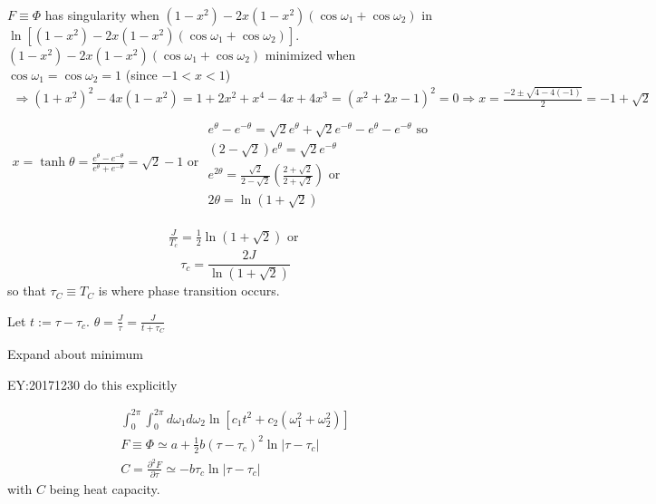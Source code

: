 \documentclass[10pt]{amsart}
\begin{document}
\begin{multicols*}{2}
$F \equiv \Phi$ has singularity when $  (1-x^2) -  2x(1-x^2) \left( \cos{  \omega_1 } + \cos{  \omega_2 } \right)  $ in $\ln{ \left[ (1-x^2) -  2x(1-x^2) \left( \cos{  \omega_1 } + \cos{  \omega_2 } \right) \right]  }$.  \\
$  (1-x^2) -  2x(1-x^2) \left( \cos{  \omega_1 } + \cos{  \omega_2 } \right) $ minimized when $\cos{\omega_1} = \cos{\omega_2}=1$ (since $-1 < x < 1$) 
\[
\begin{gathered}
\Longrightarrow (1+x^2)^2 - 4x(1-x^2 ) = 1+2x^2 + x^4 - 4x + 4x^3 = (x^2+2x-1)^2 =0 \Longrightarrow x = \frac{-2 \pm \sqrt{ 4-4(-1) } }{2} = -1 + \sqrt{2} \\
x = \tanh{\theta} = \frac{e^{\theta} - e^{-\theta} }{ e^{\theta} + e^{-\theta} } = \sqrt{2}  -1 \text{ or } \begin{gathered}
\qquad \\ e^{\theta} - e^{-\theta} = \sqrt{2} e^{\theta} + \sqrt{2} e^{-\theta} - e^{\theta} - e^{-\theta} \text{ so } \\ 
(2-\sqrt{2}) e^{\theta} = \sqrt{2} e^{-\theta} \\
e^{2\theta} = \frac{\sqrt{2}}{ 2-\sqrt{2}} \left( \frac{2+\sqrt{2} }{ 2 + \sqrt{2}} \right) \text{ or } \\ 
2\theta = \ln{ (1+ \sqrt{2})}
\end{gathered}
\end{gathered}
\]

\[
\begin{gathered}
\frac{J}{T_c} = \frac{1}{2} \ln{ (1+\sqrt{2})} \text{ or } 
\end{gathered}
\]
\begin{equation}
\boxed{ \tau_c = \frac{2J}{ \ln{ (1+\sqrt{2}) }} }
\end{equation}
so that $\tau_C \equiv T_C$ is where phase transition occurs.  

Let $t:= \tau - \tau_c$.  $\theta = \frac{J}{\tau} = \frac{J}{t+\tau_C}$  

Expand about minimum  

EY:20171230 do this explicitly 

\[
\begin{gathered}
\int_0^{2\pi } \int_0^{2\pi} d\omega_1 d\omega_2 \ln{ [ c_1 t^2 + c_2(\omega_1^2 + \omega_2^2 )]} \\ 
F  \equiv \Phi \simeq a + \frac{1}{2} b (\tau-\tau_c)^2 \ln{ |\tau-\tau_c|} \\ 
C = \frac{ \partial^2 F}{ \partial \tau } \simeq - b\tau_c \ln{ |\tau-\tau_c| }
\end{gathered}
\]
with $C$ being heat capacity.  


\end{multicols*}
\end{document}
